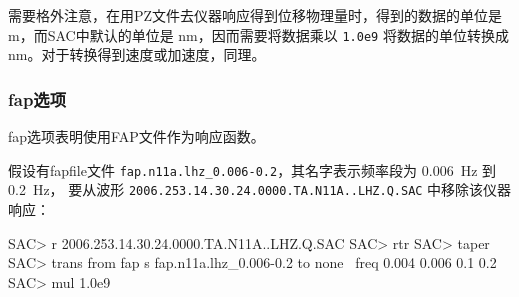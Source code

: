 需要格外注意，在用PZ文件去仪器响应得到位移物理量时，得到的数据的单位是
\si{m}，而SAC中默认的单位是 \si{nm}，因而需要将数据乘以 \texttt{1.0e9}
将数据的单位转换成 \si{nm}。对于转换得到速度或加速度，同理。

\subsubsection{fap选项}
fap选项表明使用FAP文件作为响应函数。

假设有fapfile文件 \verb|fap.n11a.lhz_0.006-0.2|，其名字表示频率段为
\SI{0.006}{\Hz} 到 \SI{0.2}{\Hz}，
要从波形 \texttt{2006.253.14.30.24.0000.TA.N11A..LHZ.Q.SAC} 中移除该仪器响应：
\begin{SACCode}
SAC> r 2006.253.14.30.24.0000.TA.N11A..LHZ.Q.SAC
SAC> rtr
SAC> taper
SAC> trans from fap s fap.n11a.lhz_0.006-0.2 to none \
                        freq 0.004 0.006 0.1 0.2
SAC> mul 1.0e9
\end{SACCode}
